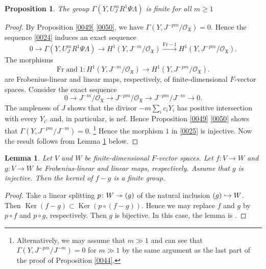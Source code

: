\documentclass{amsart}
\newtheorem{Prop}[Thm]{Proposition}
\newtheorem{Lem}[Thm]{Lemma}
\theoremstyle{remark}
\numberwithin{equation}{section}
\newcommand{\Order}{\mathcal{O}}
\newcommand{\into}{\hookrightarrow}
\newcommand{\onto}{\twoheadrightarrow}
\newcommand{\compose}{\mathbin{\circ}}
\newcommand{\Frob}{\mathrm{Fr}}
\DeclareMathOperator{\Ker}{Ker}
\let\Im\relax
\DeclareMathOperator{\Im}{Im}
\begin{document}
\begin{Prop} \label{0047}
	The group $\Gamma(Y, U_{J}^{m} R^{1} \Psi \Lambda)$ is finite for all $m \ge 1$
\end{Prop}

\begin{proof}
	By Proposition \ref{0049} \eqref{0050},
	we have $\Gamma(Y, J^{- p m} / \Order_{\mathfrak{X}}) = 0$.
	Hence the sequence \eqref{0024} induces an exact sequence
		\begin{equation} \label{0039}
				0
			\to
				\Gamma(Y, U_{J}^{m} R^{1} \Psi \Lambda)
			\to
				H^{1}(Y, J^{- m} / \Order_{\mathfrak{X}})
			\stackrel{\Frob - 1}{\to}
				H^{1}(Y, J^{- p m} / \Order_{\mathfrak{X}}).
		\end{equation}
	The morphisms
		\begin{equation} \label{0025}
				\Frob \; \text{and} \; 1
			\colon
				H^{1}(Y, J^{- m} / \Order_{\mathfrak{X}})
			\to
				H^{1}(Y, J^{- p m} / \Order_{\mathfrak{X}}).
		\end{equation}
	are Frobenius-linear and linear maps, respectively,
	of finite-dimensional $F$-vector spaces.
	Consider the exact sequence
		\[
				0
			\to
				J^{- m} / \Order_{\mathfrak{X}}
			\to
				J^{- p m} / \Order_{\mathfrak{X}}
			\to
				J^{- p m} / J^{- m}
			\to
				0.
		\]
	The ampleness of $J$ shows that
	the divisor $- m \sum_{i} c_{i} Y_{i}$ has positive intersection with every $Y_{i'}$
	and, in particular, is nef.
	Hence Proposition \ref{0049} \eqref{0050} shows that
	$\Gamma(Y, J^{- p m} / J^{- m}) = 0$.%
	\footnote{
		Alternatively, we may assume that $m \gg 1$
		and can see that $\Gamma(Y, J^{- p m} / J^{- m}) = 0$ for $m \gg 1$
		by the same argument as the last part of the proof of Proposition \ref{0044}.
	}
	Hence the morphism $1$ in \eqref{0025} is injective.
	Now the result follows from Lemma \ref{0058} below.
\end{proof}

\begin{Lem} \label{0058}
	Let $V$ and $W$ be finite-dimensional $F$-vector spaces.
	Let $f \colon V \to W$ and $g \colon V \to W$ be Frobenius-linear
	and linear maps, respectively.
	Assume that $g$ is injective.
	Then the kernel of $f - g$ is a finite group.
\end{Lem}

\begin{proof}
	Take a linear splitting $p \colon W \onto \Im(g)$ of the natural inclusion $\Im(g) \into W$.
	Then $\Ker(f - g) \subset \Ker(p \compose (f - g))$.
	Hence we may replace $f$ and $g$ by $p \compose f$ and $p \compose g$, respectively.
	Then $g$ is bijective.
	In this case, the lemma is \cite[Tag 0A3L]{Sta22}.
\end{proof}
\end{document}

